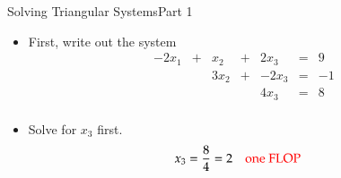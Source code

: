 \documentclass[10pt]{beamer}
\begin{document}
\begin{frame}{Solving Triangular Systems}{Part 1}


\begin{itemize}
    \item<2-> First, write out the system
\begin{equation*}
    \begin{array}{rcrcrcr}
      -2 x_1 & + &   x_2  & + &  2x_3 &= &  9  \\
             &   &  3x_2  & + & -2x_3 &= & -1  \\
             &   &        &   &  4x_3 &= &  8  \\
    \end{array}
\end{equation*}

    \item<3-> Solve for $x_3$ first. 
\begin{align*}
      x_3 &= \frac{8}{4} = 2 \quad \text{\color{red}one FLOP}
\end{align*}

\end{itemize}
\end{frame}
\end{document}
